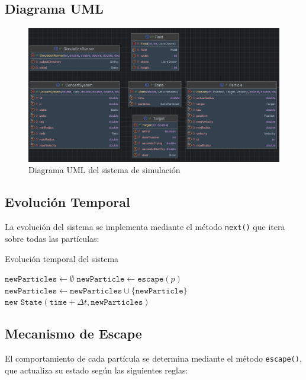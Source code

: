 \documentclass[12pt]{article}
\begin{document}
\subsection{Diagrama UML}
\begin{figure}[H]
    \centering
    \includegraphics[width=\textwidth]{img/UML.jpg}
    \caption{Diagrama UML del sistema de simulación}
    \label{fig:uml-diagram}
\end{figure}

\subsection{Evolución Temporal}
La evolución del sistema se implementa mediante el método \texttt{next()} que itera sobre todas las partículas:

\begin{algorithm}[H]
\caption{Evolución temporal del sistema}
\begin{algorithmic}[1]
\State $\texttt{newParticles} \leftarrow \emptyset$
    \State $\texttt{newParticle} \leftarrow \texttt{escape}(p)$
        \State $\texttt{newParticles} \leftarrow \texttt{newParticles} \cup \{\texttt{newParticle}\}$
    \EndIf
\EndFor
\State \Return $\texttt{new State}(\texttt{time} + \Delta t, \texttt{newParticles})$
\end{algorithmic}
\end{algorithm}

\subsection{Mecanismo de Escape}
El comportamiento de cada partícula se determina mediante el método \texttt{escape()}, que actualiza su estado según las siguientes reglas:
\end{document}
